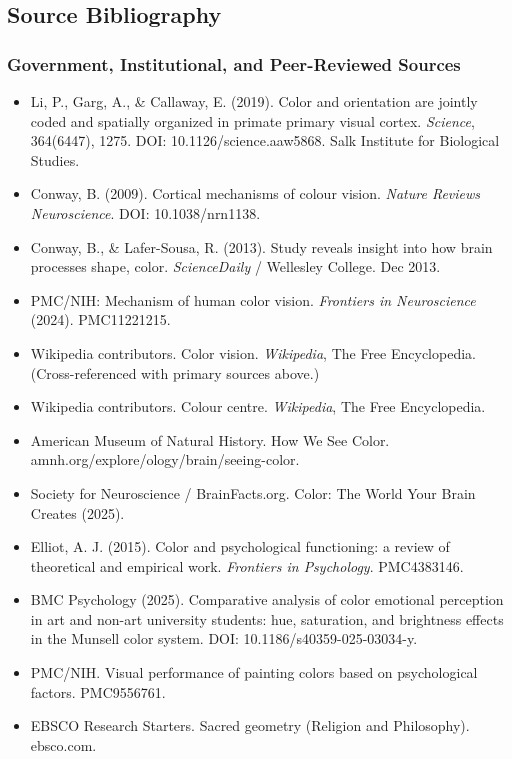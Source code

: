 \documentclass[11pt,letterpaper]{article}
\begin{document}
\subsection{Source Bibliography}

\subsubsection{Government, Institutional, and Peer-Reviewed Sources}

\begin{itemize}[noitemsep]
  \item Li, P., Garg, A., \& Callaway, E. (2019). Color and orientation are jointly coded and spatially organized in primate primary visual cortex. \textit{Science}, 364(6447), 1275. DOI: 10.1126/science.aaw5868. Salk Institute for Biological Studies.
  \item Conway, B. (2009). Cortical mechanisms of colour vision. \textit{Nature Reviews Neuroscience}. DOI: 10.1038/nrn1138.
  \item Conway, B., \& Lafer-Sousa, R. (2013). Study reveals insight into how brain processes shape, color. \textit{ScienceDaily} / Wellesley College. Dec 2013.
  \item PMC/NIH: Mechanism of human color vision. \textit{Frontiers in Neuroscience} (2024). PMC11221215.
  \item Wikipedia contributors. Color vision. \textit{Wikipedia}, The Free Encyclopedia. (Cross-referenced with primary sources above.)
  \item Wikipedia contributors. Colour centre. \textit{Wikipedia}, The Free Encyclopedia.
  \item American Museum of Natural History. How We See Color. amnh.org/explore/ology/brain/seeing-color.
  \item Society for Neuroscience / BrainFacts.org. Color: The World Your Brain Creates (2025).
  \item Elliot, A. J. (2015). Color and psychological functioning: a review of theoretical and empirical work. \textit{Frontiers in Psychology}. PMC4383146.
  \item BMC Psychology (2025). Comparative analysis of color emotional perception in art and non-art university students: hue, saturation, and brightness effects in the Munsell color system. DOI: 10.1186/s40359-025-03034-y.
  \item PMC/NIH. Visual performance of painting colors based on psychological factors. PMC9556761.
  \item EBSCO Research Starters. Sacred geometry (Religion and Philosophy). ebsco.com.
\end{itemize}
\end{document}
